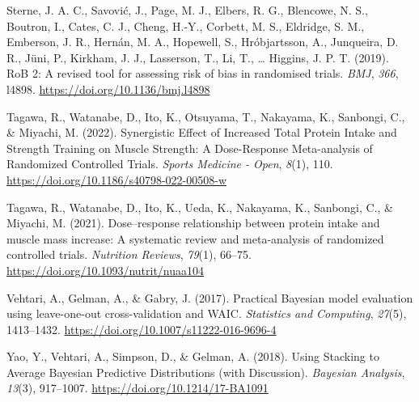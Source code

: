 \documentclass[
]{article}
\newlength{\cslhangindent}
\newenvironment{CSLReferences}[2] %
 {\begin{list}{}{%
  \setlength{\itemindent}{0pt}
  \setlength{\leftmargin}{0pt}
  \setlength{\parsep}{0pt}
  \ifodd #1
   \setlength{\leftmargin}{\cslhangindent}
   \setlength{\itemindent}{-1\cslhangindent}
  \fi
  \setlength{\itemsep}{#2\baselineskip}}}
 {\end{list}}
\begin{document}
\begin{CSLReferences}{1}{0}
Sterne, J. A. C., Savović, J., Page, M. J., Elbers, R. G., Blencowe, N.
S., Boutron, I., Cates, C. J., Cheng, H.-Y., Corbett, M. S., Eldridge,
S. M., Emberson, J. R., Hernán, M. A., Hopewell, S., Hróbjartsson, A.,
Junqueira, D. R., Jüni, P., Kirkham, J. J., Lasserson, T., Li, T.,
\ldots{} Higgins, J. P. T. (2019). {RoB} 2: A revised tool for assessing
risk of bias in randomised trials. \emph{BMJ}, \emph{366}, l4898.
\url{https://doi.org/10.1136/bmj.l4898}

Tagawa, R., Watanabe, D., Ito, K., Otsuyama, T., Nakayama, K., Sanbongi,
C., \& Miyachi, M. (2022). Synergistic {Effect} of {Increased Total
Protein Intake} and {Strength Training} on {Muscle Strength}: {A
Dose-Response Meta-analysis} of {Randomized Controlled Trials}.
\emph{Sports Medicine - Open}, \emph{8}(1), 110.
\url{https://doi.org/10.1186/s40798-022-00508-w}

Tagawa, R., Watanabe, D., Ito, K., Ueda, K., Nakayama, K., Sanbongi, C.,
\& Miyachi, M. (2021). Dose--response relationship between protein
intake and muscle mass increase: A systematic review and meta-analysis
of randomized controlled trials. \emph{Nutrition Reviews}, \emph{79}(1),
66--75. \url{https://doi.org/10.1093/nutrit/nuaa104}

Vehtari, A., Gelman, A., \& Gabry, J. (2017). Practical {Bayesian} model
evaluation using leave-one-out cross-validation and {WAIC}.
\emph{Statistics and Computing}, \emph{27}(5), 1413--1432.
\url{https://doi.org/10.1007/s11222-016-9696-4}

Yao, Y., Vehtari, A., Simpson, D., \& Gelman, A. (2018). Using
{Stacking} to {Average Bayesian Predictive Distributions} (with
{Discussion}). \emph{Bayesian Analysis}, \emph{13}(3), 917--1007.
\url{https://doi.org/10.1214/17-BA1091}

\end{CSLReferences}
\end{document}
